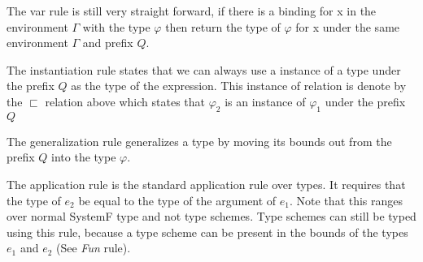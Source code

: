 \begin{prooftree}
\end{prooftree}

The var rule is still very straight forward, if there is a binding for x in the environment $\Gamma$ with the type $\varphi$ then return the type of $\varphi$ for x under the same environment $\Gamma$ and prefix $Q$.

\begin{prooftree}
\end{prooftree}

The instantiation rule states that we can always use a instance of a type under the prefix $Q$ as the type of the expression. This instance of relation is denote by the $\sqsubset$ relation above which states that $\varphi_2$ is an instance of $\varphi_1$ under the prefix $Q$

\begin{prooftree}
\end{prooftree}

The generalization rule generalizes a type by moving its bounds out from the prefix $Q$ into the type $\varphi$.

\begin{prooftree}
\end{prooftree}

The application rule is the standard application rule over types. It requires that the type of $e_2$ be equal to the type of the argument of $e_1$. Note that this ranges over normal SystemF type and not type schemes. Type schemes can still be typed using this rule, because a type scheme can be present in the bounds of the types $e_1$ and $e_2$ (See \emph{Fun} rule).

\begin{prooftree}
\end{prooftree}

